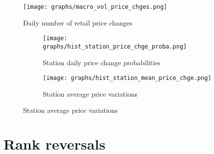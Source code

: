 \documentclass[english]{article}
\begin{document}
\begin{figure}[H]
    \caption{Daily number of retail price changes}
	\centering
		\texttt{[image: graphs/macro\_vol\_price\_chges.png]}
\label{fig:macro_vol_price_chges}
\end{figure}

\begin{figure}[H]
\centering
\caption{Histograms of station price changes}
\begin{subfigure}{.49\textwidth}
\centering
\texttt{[image: graphs/hist\_station\_price\_chge\_proba.png]}
\caption[short]{Station daily price change probabilities}
\label{fig:hist_station_price_chge_proba}
\end{subfigure}
\begin{subfigure}{.49\textwidth}
\centering
\texttt{[image: graphs/hist\_station\_mean\_price\_chge.png]}
\caption[short]{Station average price variations}
\label{fig:hist_station_mean_price_chge}
\end{subfigure}
\end{figure}

\newpage

\section{Rank reversals}
\end{document}
